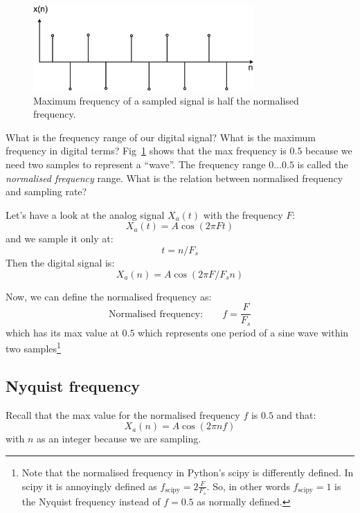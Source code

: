 \documentclass[12pt,a4paper]{article}
\begin{document}
\begin{figure}[!hbt]
\begin{center}
\mbox{\includegraphics[width=0.75\textwidth]{max_sampl}}
\end{center}
\caption{Maximum frequency of a sampled signal is half the
normalised frequency.
\label{max_sampl}}
\end{figure}


What is the frequency range of our digital signal? What is
the maximum frequency in digital terms? Fig~\ref{max_sampl} shows that the
max frequency is $0.5$ because we need two samples to
represent a ``wave''. The frequency range $0\ldots 0.5$
is called the \textsl{normalised frequency} range. What is the relation
between normalised frequency and sampling rate?

Let's have a look at the analog signal $X_{a}(t)$ with the frequency $F$:
\begin{equation}
X_{a}(t) = A\cos (2\pi F t)
\end{equation}
and we sample it only at:
\begin{equation}
t = n/F_s
\end{equation}
Then the digital signal is:
\begin{equation}
X_{a}(n) = A \cos (2 \pi F/F_s n)
\end{equation}

Now, we can define the normalised frequency as:
\begin{equation}
\mbox{Normalised frequency:} \qquad f =  \frac {F}{F_s}
\end{equation}
which has its max value at $0.5$ which represents one period of
a sine wave within two samples\footnote{Note that the normalised
frequency in Python's scipy is differently defined. In scipy it is
annoyingly defined as $f_{\mbox{scipy}} =  2 \frac {F}{F_s}$. So, in other
words $f_{\mbox{scipy}}=1$ is the Nyquist frequency instead
of $f=0.5$ as normally defined.}


\subsection{Nyquist frequency}
Recall that the max value for the normalised frequency $f$ is $0.5$
and that:
\begin{equation}
X_{a}(n) = A \cos (2 \pi n f)
\end{equation}
with $n$ as an integer because
we are sampling.
\end{document}

